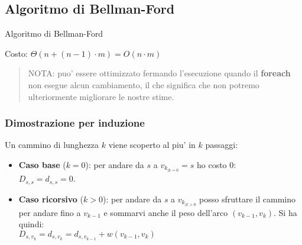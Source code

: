 \documentclass{article}
\begin{document}
\subsection{Algoritmo di Bellman-Ford}

\begin{algorithm}[H]
  \caption{Algoritmo di Bellman-Ford}
\end{algorithm}

Costo: $\Theta(n + (n-1) \cdot m) = O(n \cdot m)$

\begin{quote}
  NOTA: puo' essere ottimizzato fermando l'esecuzione quando il \textbf{foreach}
  non esegue alcun cambiamento, il che significa che non potremo ulteriormente
  migliorare le nostre stime.
\end{quote}

\subsubsection{Dimostrazione per induzione}

Un cammino di lunghezza $k$ viene scoperto al piu' in $k$ passaggi:
\begin{itemize}
  \item \textbf{Caso base} ($k = 0$): per andare da $s$ a $v_{k_{|k=0}} = s$ ho costo $0$: \\
    $D_{s,s} = d_{s,s} = 0$.
  \item \textbf{Caso ricorsivo} ($k > 0$): per andare da $s$ a $v_{k_{|k>0}}$ posso
    sfruttare il cammino per andare fino a $v_{k-1}$ e sommarvi anche il peso
    dell'arco $(v_{k-1}, v_{k})$. Si ha quindi: \\
    $D_{s,v_k} = d_{s,v_k} = d_{s, v_{k-1}} + w(v_{k-1}, v_k)$
\end{itemize}
\end{document}
